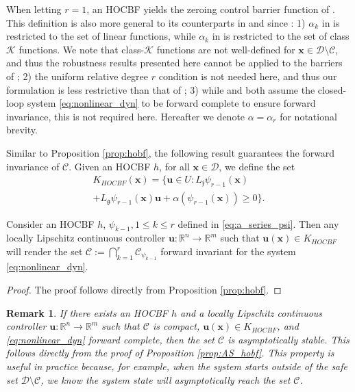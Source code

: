 \documentclass[letterpaper, 10 pt, journal, twoside]{IEEEtran}
\theoremstyle{plain}
\newtheorem{remark}{Remark}
\newcommand{\myvar}[1]{\bm{#1}}
\newcommand{\myset}[1]{\mathscr{#1}}
\begin{document}
When letting $r = 1$, an HOCBF yields {the} zeroing control barrier function {of} \cite{Xu2015a}. This definition is also more general to its counterparts in \cite{xu2018constrained} and \cite{xiao2019control} {since} : 1) $\alpha_k$ in \cite{xu2018constrained} is restricted  to {the set of} linear functions, while $\alpha_k$ in  \cite{xiao2019control} {is restricted to the set of} class $\mathcal{K}$ functions. {We note that class-$\mathcal{K}$ functions} are not well-defined for  $\myvar{x}\in \myset{D}\setminus \myset{C}$, {and} thus the robustness results presented here cannot be {applied to the barriers of \cite{xiao2019control}}; 2) {the} uniform relative degree $r$ {condition} is not needed {here}, {and thus our formulation is less restrictive than that of \cite{xiao2019control}}; 3) while \cite{xu2018constrained} and \cite{xiao2019control} both assume the closed-loop system \eqref{eq:nonlinear_dyn} to be forward complete {to ensure forward invariance}, this is not required here. Hereafter we denote $\alpha = \alpha_r$ for notational brevity.




Similar to Proposition \ref{prop:hobf}, the following result guarantees the forward invariance of $\myset{C}$. Given an HOCBF $h$, for all $\myvar{x} \in \myset{D}$, {we} define the set
\begin{multline} \label{eq:k_HOCBF}
    K_{HOCBF}(\myvar{x}) = \{ \myvar{u}\in U: L_{\mathfrak{f}} \psi_{r-1} (\myvar{x}) \\
    + L_{\mathfrak{g}} \psi_{r-1}(\myvar{x}) \myvar{u} + \alpha(\psi_{r-1}(\myvar{x})) \geq 0 \}.
\end{multline}



\begin{thm}\label{thm:forw_inv_HOCBF}
Consider an HOCBF $h$, $\psi_{k-1}, 1\leq k\leq r$ defined in \eqref{eq:a_series_psi}. Then any locally Lipschitz continuous controller $\myvar{u}: \mathbb{R}^n \to \mathbb{R}^m$ such that $\myvar{u}(\myvar{x}) \in K_{HOCBF}$ will render the set $\myset{C}:=\bigcap_{k = 1}^{r} \myset{C}_{\psi_{k-1}}$ forward invariant for {the} system \eqref{eq:nonlinear_dyn}.
\end{thm}
\begin{proof}
The proof follows directly from Proposition \ref{prop:hobf}.
\end{proof}



\begin{remark}
If there exists an HOCBF $h$ and a locally Lipschitz continuous controller $\myvar{u}: \mathbb{R}^n \to \mathbb{R}^m$ such that $\myset{C}$ is compact, $\myvar{u}(\myvar{x}) \in K_{HOCBF}$, and \eqref{eq:nonlinear_dyn} forward complete, then the set $\myset{C}$ is asymptotically stable. This follows directly from the proof of Proposition \ref{prop:AS_hobf}. This property is useful in practice because, for example,  when  the system starts outside of the safe set $\myset{D}\setminus \myset{C}$, we know the system state will asymptotically reach the set $\myset{C} $.
\end{remark}
\end{document}

